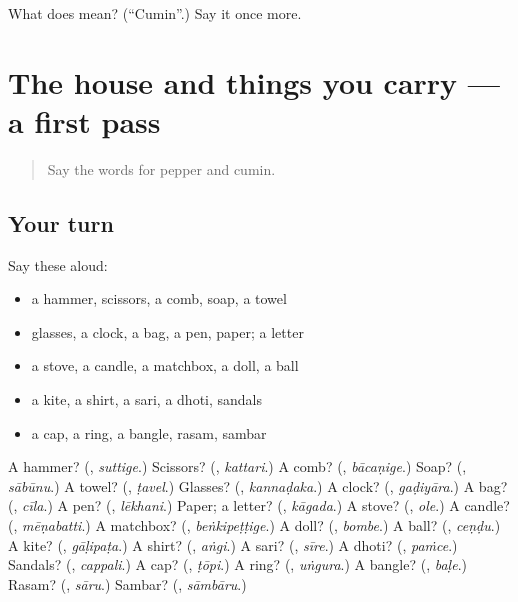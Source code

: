 \begin{tcolorbox}[breakable,colback=teal!4,colframe=teal!35!black,title={Before you move on}]
What does  mean? (\textquotedblleft{}Cumin\textquotedblright{}.) Say it once more.
\end{tcolorbox}
\section[(dialogue)]{The house and things you carry — a first pass}

\label{lesson:KA-R126-first-pass-the-house-and-things-you-carry}



\begin{quote}
Say the words for pepper and cumin.
\end{quote}

\subsection*{Your turn}
Say these aloud:

\begin{itemize}
\raggedright
  \item a hammer, scissors, a comb, soap, a towel
  \item glasses, a clock, a bag, a pen, paper; a letter
  \item a stove, a candle, a matchbox, a doll, a ball
  \item a kite, a shirt, a sari, a dhoti, sandals
  \item a cap, a ring, a bangle, rasam, sambar
\end{itemize}

\begin{tcolorbox}[breakable,colback=teal!4,colframe=teal!35!black,title={Before you move on}]
A hammer? (\textbf{}, \emph{suttige}.) Scissors? (\textbf{}, \emph{kattari}.) A comb? (\textbf{}, \emph{bācaṇige}.) Soap? (\textbf{}, \emph{sābūnu}.) A towel? (\textbf{}, \emph{ṭavel}.) Glasses? (\textbf{}, \emph{kannaḍaka}.) A clock? (\textbf{}, \emph{gaḍiyāra}.) A bag? (\textbf{}, \emph{cīla}.) A pen? (\textbf{}, \emph{lēkhani}.) Paper; a letter? (\textbf{}, \emph{kāgada}.) A stove? (\textbf{}, \emph{ole}.) A candle? (\textbf{}, \emph{mēṇabatti}.) A matchbox? (\textbf{}, \emph{beṅkipeṭṭige}.) A doll? (\textbf{}, \emph{bombe}.) A ball? (\textbf{}, \emph{ceṇḍu}.) A kite? (\textbf{}, \emph{gāḷipaṭa}.) A shirt? (\textbf{}, \emph{aṅgi}.) A sari? (\textbf{}, \emph{sīre}.) A dhoti? (\textbf{}, \emph{paṁce}.) Sandals? (\textbf{}, \emph{cappali}.) A cap? (\textbf{}, \emph{ṭōpi}.) A ring? (\textbf{}, \emph{uṅgura}.) A bangle? (\textbf{}, \emph{baḷe}.) Rasam? (\textbf{}, \emph{sāru}.) Sambar? (\textbf{}, \emph{sāmbāru}.)
\end{tcolorbox}
